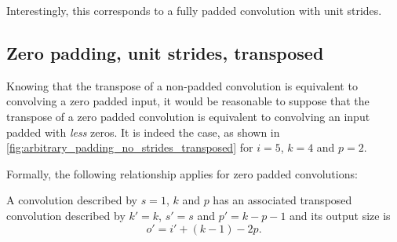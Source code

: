Interestingly, this corresponds to a fully padded convolution with unit
strides.

\subsection{Zero padding, unit strides, transposed}

Knowing that the transpose of a non-padded convolution is equivalent to
convolving a zero padded input, it would be reasonable to suppose that the
transpose of a zero padded convolution is equivalent to convolving an input
padded with {\em less\/} zeros. It is indeed the case, as shown in
\autoref{fig:arbitrary_padding_no_strides_transposed} for $i = 5$, $k = 4$ and
$p = 2$.

Formally, the following relationship applies for zero padded convolutions:

\begin{relationship}\label{rel:arbitrary_padding_no_strides_transposed}
A convolution described by $s = 1$, $k$ and $p$ has an
associated transposed convolution described by $k' = k$, $s' = s$ and $p' = k -
p - 1$ and its output size is
\begin{equation*}
    o' = i' + (k - 1) - 2p.
\end{equation*}
\end{relationship}

